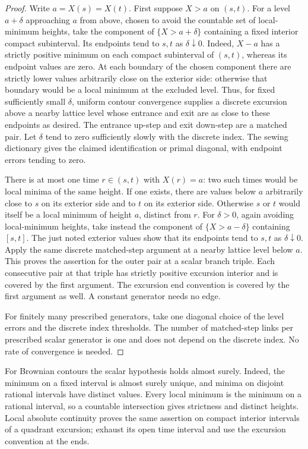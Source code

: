 \begin{proof}
Write $a=X(s)=X(t)$. First suppose $X>a$ on $(s,t)$.
For a level $a+\delta$ approaching $a$ from above, chosen to avoid
the countable set of local-minimum heights, take the component
of $\{X>a+\delta\}$ containing a fixed interior compact subinterval.
Its endpoints tend to $s,t$ as $\delta\downarrow0$. Indeed, $X-a$ has
a strictly positive minimum on each compact subinterval of $(s,t)$,
whereas its endpoint values are zero. At each boundary of the chosen
component there are strictly lower values arbitrarily close on the
exterior side: otherwise that boundary would be a local minimum at
the excluded level. Thus, for fixed sufficiently small $\delta$,
uniform contour convergence supplies a discrete excursion
above a nearby lattice level whose entrance and exit are as close to
these endpoints as desired. The entrance up-step and exit down-step
are a matched pair. Let $\delta$ tend to zero sufficiently slowly with
the discrete index. The sewing dictionary gives the claimed
identification or primal diagonal, with endpoint errors tending to
zero.

There is at most one time $r\in(s,t)$ with $X(r)=a$: two such times
would be local minima of the same height. If one exists, there are
values below $a$ arbitrarily close to $s$ on its exterior side and to
$t$ on its exterior side. Otherwise $s$ or $t$ would itself be a local
minimum of height $a$, distinct from $r$. For $\delta>0$, again
avoiding local-minimum heights, take instead
the component of $\{X>a-\delta\}$ containing $[s,t]$. The just noted
exterior values show that its endpoints tend to $s,t$ as
$\delta\downarrow0$. Apply the same discrete matched-step argument
at a nearby lattice level below $a$. This proves the assertion for
the outer pair at a scalar branch triple. Each consecutive pair at
that triple has strictly positive excursion interior and is covered
by the first argument. The excursion end convention is covered by
the first argument as well. A constant generator needs no edge.

For finitely many prescribed generators, take one diagonal choice of
the level errors and the discrete index thresholds. The number of
matched-step links per prescribed scalar generator is one and does
not depend on the discrete index. No rate of convergence is needed.
\end{proof}

For Brownian contours the scalar hypothesis holds almost surely.
Indeed, the minimum on a fixed interval is almost surely unique,
and minima on disjoint rational intervals have distinct values.
Every local minimum is the minimum on a rational interval, so a
countable intersection gives strictness and distinct heights.
Local absolute continuity proves the same assertion on compact
interior intervals of a quadrant excursion; exhaust its open time
interval and use the excursion convention at the ends.

